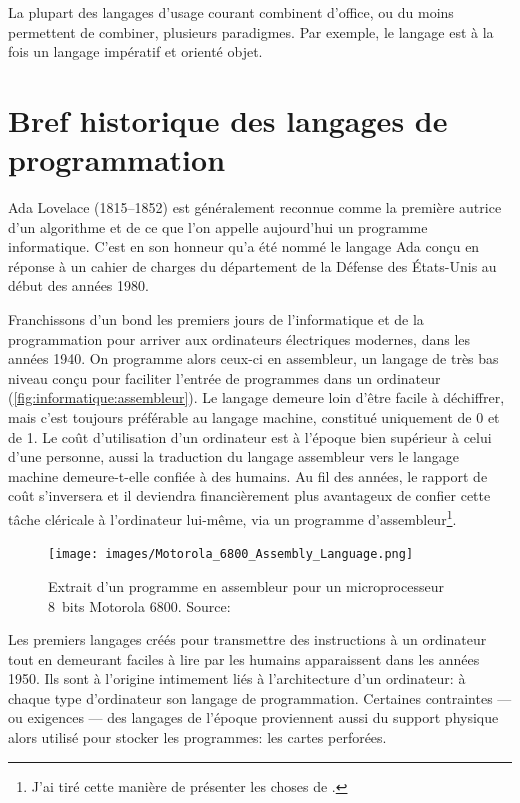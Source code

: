 La plupart des langages d'usage courant combinent d'office, ou du
moins permettent de combiner, plusieurs paradigmes. Par exemple, le
langage {\Cpp} est à la fois un langage impératif et orienté objet.


\section{Bref historique des langages de programmation}
\label{sec:informatique:historique}

Ada Lovelace (1815--1852) est généralement reconnue comme la première
autrice d'un algorithme et de ce que l'on appelle aujourd'hui un
programme informatique. C'est en son honneur qu'a été nommé le langage
Ada conçu en réponse à un cahier de charges du département de la
Défense des États-Unis au début des années 1980.

Franchissons d'un bond les premiers jours de l'informatique et de la
programmation pour arriver aux ordinateurs électriques modernes, dans
les années 1940. On programme alors ceux-ci en
assembleur, un langage de très bas niveau conçu pour
faciliter l'entrée de programmes dans un ordinateur
(\autoref{fig:informatique:assembleur}). Le langage demeure loin
d'être facile à déchiffrer, mais c'est toujours préférable au langage
machine, constitué uniquement de 0 et de 1. Le coût d'utilisation d'un
ordinateur est à l'époque bien supérieur à celui d'une personne, aussi
la traduction du langage assembleur vers le langage machine
demeure-t-elle confiée à des humains. Au fil des années, le rapport de
coût s'inversera et il deviendra financièrement plus avantageux de
confier cette tâche cléricale à l'ordinateur lui-même, via un
programme d'assembleur\footnote{%
  J'ai tiré cette manière de présenter les choses de
  \cite{Oualline:C:1997}.}.

\begin{figure}
  \centering
  \texttt{[image: images/Motorola\_6800\_Assembly\_Language.png]}
  \caption[Programme en assembleur pour un microprocesseur 8~bits
    Motorola 6800]{Extrait d'un programme en assembleur pour un
    microprocesseur 8~bits Motorola 6800. {\small Source:
      }}
  \label{fig:informatique:assembleur}
\end{figure}

Les premiers langages créés pour transmettre des instructions à un
ordinateur tout en demeurant faciles à lire par les humains
apparaissent dans les années 1950. Ils sont à l'origine intimement
liés à l'architecture d'un ordinateur: à chaque type d'ordinateur son
langage de programmation. Certaines contraintes --- ou exigences ---
des langages de l'époque proviennent aussi du support physique alors
utilisé pour stocker les programmes: les cartes perforées.

